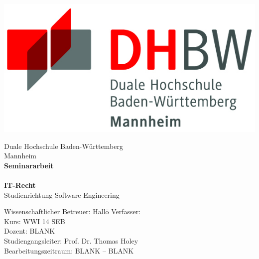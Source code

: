 \begin{titlepage}
\begin{minipage}{\textwidth}
		\noindent  \hfill   \includegraphics{img/logo.jpg}
\end{minipage}
\vspace{1em}
\sffamily
\begin{center}
	\textsf{\large{}Duale Hochschule Baden-W\"urttemberg\\[1.5mm] Mannheim}\\[2em]
	\textsf{\textbf{\Large{}Seminararbeit}}\\[3mm]
	\textsf{\textbf{\DerTitelDerArbeit}} \\[1.5cm]
	\textsf{\textbf{\Large{}IT-Recht}\\[3mm] \textsf{Studienrichtung Software Engineering}}
	
\vspace{10em}

\begin{minipage}{\textwidth}

\begin{tabbing}
	Wissenschaftlicher Betreuer: Hallo\hspace{0.85cm}\=\kill
	Verfasser: \> \DerAutorDerArbeit \\[1.5mm]
	Kurs: \> WWI 14 SEB \\[1.5mm]
	Dozent: \> BLANK \\[1.5mm]
	Studiengangsleiter: \> Prof. Dr. Thomas Holey  \\[1.5mm]
	Bearbeitungszeitraum: \> BLANK -- BLANK
\end{tabbing}
\end{minipage}

\end{center}

\end{titlepage}